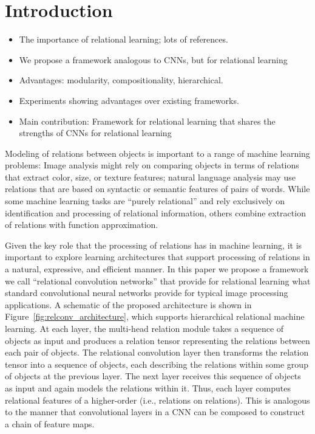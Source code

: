 \section{Introduction}\label{sec:intro}

\begin{itemize}
    \item The importance of relational learning; lots of references.
    \item We propose a framework analogous to CNNs, but for relational learning
    \item Advantages: modularity, compositionality, hierarchical.
    \item Experiments showing advantages over existing frameworks. 
    \item Main contribution: Framework for relational learning that shares the strengths of CNNs for relational learning
\end{itemize}

Modeling of relations between objects is important to a range of machine learning problems:
Image analysis might rely on comparing objects in terms of relations that extract color, 
size, or texture features; natural language analysis may use relations that are based on syntactic or semantic features of pairs of words. While some machine learning tasks are ``purely relational'' and rely exclusively on identification and processing of relational information, others combine extraction of relations with function approximation. 

Given the key role that the processing of relations has in machine learning, it is important to explore learning architectures that support processing of relations in a natural, expressive, and efficient manner. In this paper we propose a framework we call ``relational convolution networks'' that provide for relational learning what standard convolutional neural networks provide for typical image processing applications. A schematic of the proposed architecture is shown in Figure~\ref{fig:relconv_architecture},
which supports hierarchical relational machine learning. At each layer, the multi-head relation module takes a sequence of objects as input and produces a relation tensor representing the relations between each pair of objects. The relational convolution layer then transforms the relation tensor into a sequence of objects, each describing the relations within some group of objects at the previous layer. The next layer receives this sequence of objects as input and again models the relations within it. Thus, each layer computes relational features of a higher-order (i.e., relations on relations). This is analogous to the manner that convolutional layers in a CNN can be composed to construct a chain of feature maps. 


